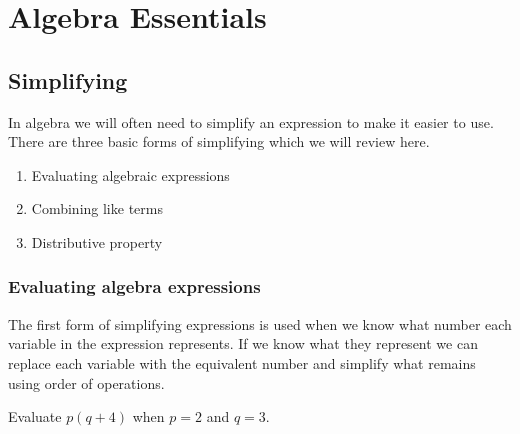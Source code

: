 \chapter{Algebra Essentials}
\section{Simplifying}
In algebra we will often need to simplify an expression to make it easier to use. There are three basic forms of simplifying which we will review here.
\begin{enumerate}[label=\protect\circled{\arabic*}]
	\item Evaluating algebraic expressions
	\item Combining like terms
	\item Distributive property
\end{enumerate}
\subsection{Evaluating algebra expressions}
The first form of simplifying expressions is used when we know what number each variable in the expression represents. If we know what they represent we can replace each variable with the equivalent number and simplify what remains using order of operations.
\begin{exa}
	Evaluate $p(q+4)$ when $p=2$ and $q=3$.  
\end{exa}


